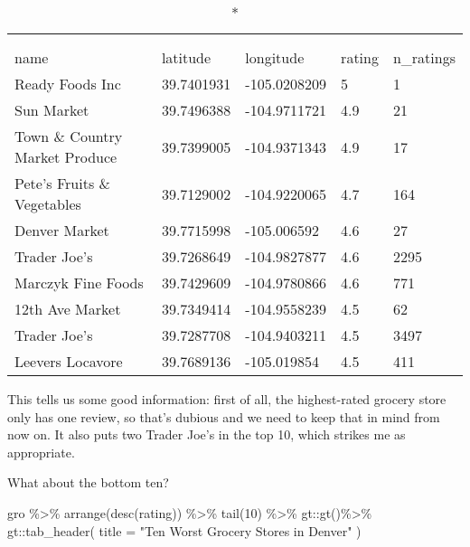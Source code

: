 \documentclass[]{tufte-handout}
\newenvironment{Shaded}{}{}
\newcommand{\AttributeTok}[1]{\textcolor[rgb]{0.49,0.56,0.16}{#1}}
\newcommand{\DecValTok}[1]{\textcolor[rgb]{0.25,0.63,0.44}{#1}}
\newcommand{\FunctionTok}[1]{\textcolor[rgb]{0.02,0.16,0.49}{#1}}
\newcommand{\NormalTok}[1]{#1}
\newcommand{\SpecialCharTok}[1]{\textcolor[rgb]{0.25,0.44,0.63}{#1}}
\newcommand{\StringTok}[1]{\textcolor[rgb]{0.25,0.44,0.63}{#1}}
\begin{document}
\captionsetup[table]{labelformat=empty,skip=1pt}
\begin{longtable}{lllll}
\caption*{
\large Top Ten Rated Grocery Stores in Denver\\ 
} \\ 
\toprule
name & latitude & longitude & rating & n\_ratings \\ 
\midrule
Ready Foods Inc & 39.7401931 & -105.0208209 & 5 & 1 \\ 
Sun Market & 39.7496388 & -104.9711721 & 4.9 & 21 \\ 
Town \& Country Market Produce & 39.7399005 & -104.9371343 & 4.9 & 17 \\ 
Pete's Fruits \& Vegetables & 39.7129002 & -104.9220065 & 4.7 & 164 \\ 
Denver Market & 39.7715998 & -105.006592 & 4.6 & 27 \\ 
Trader Joe's & 39.7268649 & -104.9827877 & 4.6 & 2295 \\ 
Marczyk Fine Foods & 39.7429609 & -104.9780866 & 4.6 & 771 \\ 
12th Ave Market & 39.7349414 & -104.9558239 & 4.5 & 62 \\ 
Trader Joe's & 39.7287708 & -104.9403211 & 4.5 & 3497 \\ 
Leevers Locavore & 39.7689136 & -105.019854 & 4.5 & 411 \\ 
\bottomrule
\end{longtable}

This tells us some good information: first of all, the highest-rated
grocery store only has one review, so that's dubious and we need to keep
that in mind from now on. It also puts two Trader Joe's in the top 10,
which strikes me as appropriate.

What about the bottom ten?

\begin{Shaded}
\begin{Highlighting}[]
\NormalTok{gro }\SpecialCharTok{\%\textgreater{}\%} 
  \FunctionTok{arrange}\NormalTok{(}\FunctionTok{desc}\NormalTok{(rating)) }\SpecialCharTok{\%\textgreater{}\%} 
  \FunctionTok{tail}\NormalTok{(}\DecValTok{10}\NormalTok{) }\SpecialCharTok{\%\textgreater{}\%} 
\NormalTok{  gt}\SpecialCharTok{::}\FunctionTok{gt}\NormalTok{()}\SpecialCharTok{\%\textgreater{}\%} 
\NormalTok{   gt}\SpecialCharTok{::}\FunctionTok{tab\_header}\NormalTok{(}
    \AttributeTok{title =} \StringTok{"Ten Worst Grocery Stores in Denver"}
\NormalTok{  ) }
\end{Highlighting}
\end{Shaded}
\end{document}
